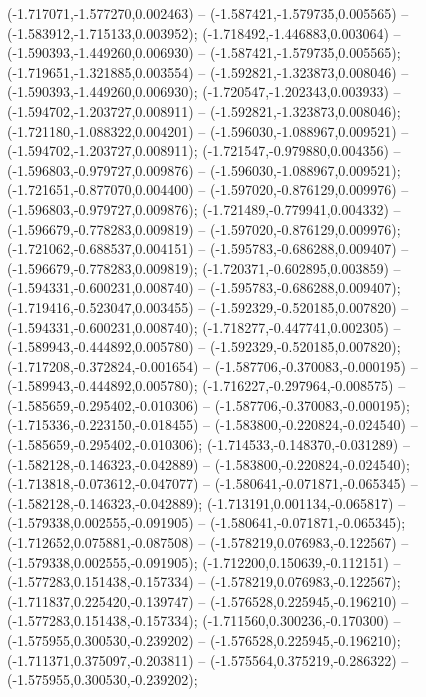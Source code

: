  (-1.717071,-1.577270,0.002463) -- (-1.587421,-1.579735,0.005565) -- (-1.583912,-1.715133,0.003952);
 (-1.718492,-1.446883,0.003064) -- (-1.590393,-1.449260,0.006930) -- (-1.587421,-1.579735,0.005565);
 (-1.719651,-1.321885,0.003554) -- (-1.592821,-1.323873,0.008046) -- (-1.590393,-1.449260,0.006930);
 (-1.720547,-1.202343,0.003933) -- (-1.594702,-1.203727,0.008911) -- (-1.592821,-1.323873,0.008046);
 (-1.721180,-1.088322,0.004201) -- (-1.596030,-1.088967,0.009521) -- (-1.594702,-1.203727,0.008911);
 (-1.721547,-0.979880,0.004356) -- (-1.596803,-0.979727,0.009876) -- (-1.596030,-1.088967,0.009521);
 (-1.721651,-0.877070,0.004400) -- (-1.597020,-0.876129,0.009976) -- (-1.596803,-0.979727,0.009876);
 (-1.721489,-0.779941,0.004332) -- (-1.596679,-0.778283,0.009819) -- (-1.597020,-0.876129,0.009976);
 (-1.721062,-0.688537,0.004151) -- (-1.595783,-0.686288,0.009407) -- (-1.596679,-0.778283,0.009819);
 (-1.720371,-0.602895,0.003859) -- (-1.594331,-0.600231,0.008740) -- (-1.595783,-0.686288,0.009407);
 (-1.719416,-0.523047,0.003455) -- (-1.592329,-0.520185,0.007820) -- (-1.594331,-0.600231,0.008740);
 (-1.718277,-0.447741,0.002305) -- (-1.589943,-0.444892,0.005780) -- (-1.592329,-0.520185,0.007820);
 (-1.717208,-0.372824,-0.001654) -- (-1.587706,-0.370083,-0.000195) -- (-1.589943,-0.444892,0.005780);
 (-1.716227,-0.297964,-0.008575) -- (-1.585659,-0.295402,-0.010306) -- (-1.587706,-0.370083,-0.000195);
 (-1.715336,-0.223150,-0.018455) -- (-1.583800,-0.220824,-0.024540) -- (-1.585659,-0.295402,-0.010306);
 (-1.714533,-0.148370,-0.031289) -- (-1.582128,-0.146323,-0.042889) -- (-1.583800,-0.220824,-0.024540);
 (-1.713818,-0.073612,-0.047077) -- (-1.580641,-0.071871,-0.065345) -- (-1.582128,-0.146323,-0.042889);
 (-1.713191,0.001134,-0.065817) -- (-1.579338,0.002555,-0.091905) -- (-1.580641,-0.071871,-0.065345);
 (-1.712652,0.075881,-0.087508) -- (-1.578219,0.076983,-0.122567) -- (-1.579338,0.002555,-0.091905);
 (-1.712200,0.150639,-0.112151) -- (-1.577283,0.151438,-0.157334) -- (-1.578219,0.076983,-0.122567);
 (-1.711837,0.225420,-0.139747) -- (-1.576528,0.225945,-0.196210) -- (-1.577283,0.151438,-0.157334);
 (-1.711560,0.300236,-0.170300) -- (-1.575955,0.300530,-0.239202) -- (-1.576528,0.225945,-0.196210);
 (-1.711371,0.375097,-0.203811) -- (-1.575564,0.375219,-0.286322) -- (-1.575955,0.300530,-0.239202);

